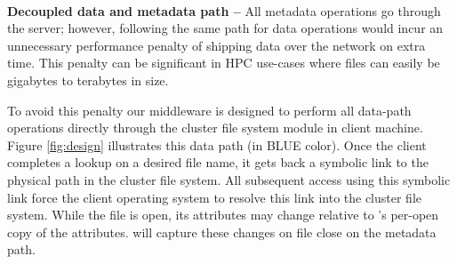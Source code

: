 ~\\
\textbf{Decoupled data and metadata path -- }
All metadata operations go through the \giga{} server; however, following the
same path for data operations would incur an unnecessary performance penalty 
of shipping data over the network on extra time. 
This penalty can be significant in HPC use-cases where files can easily be  
gigabytes to terabytes in size.

To avoid this penalty our middleware is designed to perform all
data-path operations directly through the cluster file system module in client
machine. 
Figure \ref{fig:design} illustrates this data path (in BLUE color).
Once the client completes a
lookup on a desired file name, it gets back a symbolic link to the physical
path in the cluster file system. All subsequent access using this symbolic
link force the client operating system to resolve this link into the cluster
file system.
While the file is open, its attributes may change relative to \ldb's per-open
copy of the attributes. \giga will capture these changes on file close on the
metadata path.



